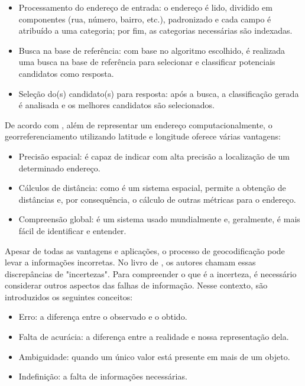 \begin{itemize}
   \item Processamento do endereço de entrada: o endereço é lido, dividido em componentes (rua, número, bairro, etc.), padronizado e cada campo é atribuído a uma categoria; por fim, as categorias necessárias são indexadas.
   \item Busca na base de referência: com base no algoritmo escolhido, é realizada uma busca na base de referência para selecionar e classificar potenciais candidatos como resposta.
   \item Seleção do(s) candidato(s) para resposta: após a busca, a classificação gerada é analisada e os melhores candidatos são selecionados.
\end{itemize}

De acordo com \cite{longley2013}, além de representar um endereço computacionalmente, o georreferenciamento utilizando latitude e longitude oferece várias vantagens:

\begin{itemize}
   \item Precisão espacial: é capaz de indicar com alta precisão a localização de um determinado endereço.
   \item Cálculos de distância: como é um sistema espacial, permite a obtenção de distâncias e, por consequência, o cálculo de outras métricas para o endereço.
   \item Compreensão global: é um sistema usado mundialmente e, geralmente, é mais fácil de identificar e entender.
\end{itemize}

Apesar de todas as vantagens e aplicações, o processo de geocodificação pode levar a informações incorretas. No livro de \cite{longley2013}, os autores chamam essas discrepâncias de "incertezas". Para compreender o que é a incerteza, é necessário considerar outros aspectos das falhas de informação. Nesse contexto, são introduzidos os seguintes conceitos:

\begin{itemize}
   \item Erro: a diferença entre o observado e o obtido.
   \item Falta de acurácia: a diferença entre a realidade e nossa representação dela.
   \item Ambiguidade: quando um único valor está presente em mais de um objeto.
   \item Indefinição: a falta de informações necessárias.
\end{itemize}

